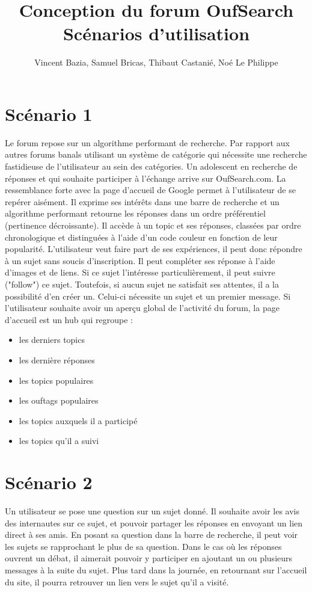 \documentclass[a4paper,11pt]{report}
\begin{document}
\title{\textbf{Conception du forum OufSearch}\\Scénarios d'utilisation}
\author{}
\date{Vincent Bazia, Samuel Bricas, Thibaut Castanié, Noé Le Philippe}
\pagestyle{empty}
\maketitle

\section*{Scénario 1}
Le forum repose sur un algorithme performant de recherche. Par rapport aux autres forums banals utilisant un système de catégorie qui nécessite une recherche fastidieuse de l'utilisateur au sein des catégories.
Un adolescent en recherche de réponses et qui souhaite participer à l'échange arrive sur OufSearch.com. La ressemblance forte avec la page d'accueil de Google permet à l'utilisateur de se repérer aisément. Il exprime ses intérêts dans une barre de recherche et un algorithme performant retourne les réponses dans un ordre préférentiel (pertinence décroissante).
Il accède à un topic et ses réponses, classées par ordre chronologique et distinguées à l'aide d'un code couleur en fonction de leur popularité. L'utilisateur veut faire part de ses expériences, il peut donc répondre à un sujet sans soucis d'inscription. Il peut compléter ses réponse à l'aide d'images et de liens. Si ce sujet l'intéresse particulièrement, il peut suivre ("follow") ce sujet.
Toutefois, si aucun sujet ne satisfait ses attentes, il a la possibilité d’en créer un. Celui-ci nécessite un sujet et un premier message.
Si l'utilisateur souhaite avoir un aperçu global de l'activité du forum, la page d'accueil est un hub qui regroupe :
\begin{itemize}
\item{les derniers topics}
\item{les dernière réponses}
\item{les topics populaires}
\item{les ouftags populaires}
\item{les topics auxquels il a participé}
\item{les topics qu'il a suivi}
\end{itemize}
\section*{Scénario 2}
Un utilisateur se pose une question sur un sujet donné. Il souhaite avoir les avis des internautes sur ce sujet, et pouvoir partager les réponses en envoyant un lien direct à ses amis. En posant sa question dans la barre de recherche, il peut voir les sujets se rapprochant le plus de sa question. Dans le cas où les réponses ouvrent un débat, il aimerait pouvoir y participer en ajoutant un ou plusieurs messages à la suite du sujet. Plus tard dans la journée, en retournant sur l'accueil du site, il pourra retrouver un lien vers le sujet qu'il a visité.
\end{document}
